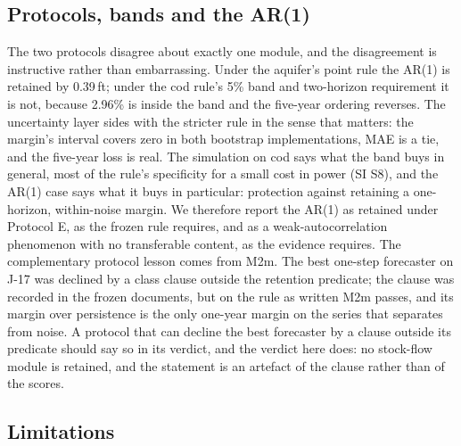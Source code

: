 \subsection{Protocols, bands and the AR(1)}\label{sec:protocoldiff}

The two protocols disagree about exactly one module, and the disagreement is instructive rather than embarrassing. Under the aquifer's point rule the AR(1) is retained by 0.39\,ft; under the cod rule's 5\% band and two-horizon requirement it is not, because 2.96\% is inside the band and the five-year ordering reverses. The uncertainty layer sides with the stricter rule in the sense that matters: the margin's interval covers zero in both bootstrap implementations, MAE is a tie, and the five-year loss is real. The simulation on cod says what the band buys in general, most of the rule's specificity for a small cost in power (SI S8), and the AR(1) case says what it buys in particular: protection against retaining a one-horizon, within-noise margin. We therefore report the AR(1) as retained under Protocol E, as the frozen rule requires, and as a weak-autocorrelation phenomenon with no transferable content, as the evidence requires. The complementary protocol lesson comes from M2m. The best one-step forecaster on J-17 was declined by a class clause outside the retention predicate; the clause was recorded in the frozen documents, but on the rule as written M2m passes, and its margin over persistence is the only one-year margin on the series that separates from noise. A protocol that can decline the best forecaster by a clause outside its predicate should say so in its verdict, and the verdict here does: no stock-flow module is retained, and the statement is an artefact of the clause rather than of the scores.

\subsection{Limitations}\label{sec:limits}

